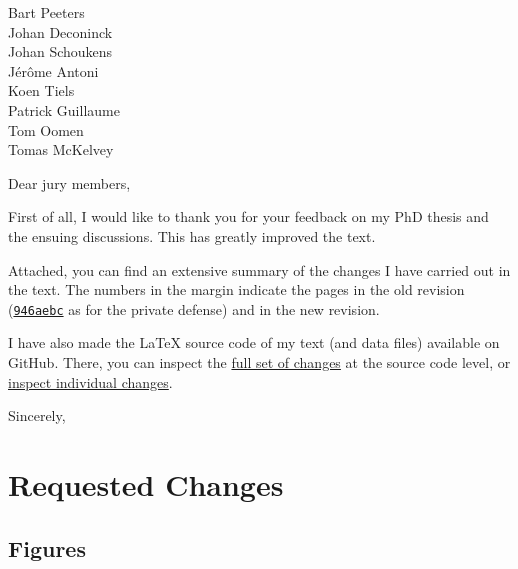 \documentclass{responseletter}
\date{\today}
\begin{document}
\begin{letter}{%
Bart Peeters \\
Johan Deconinck \\
Johan Schoukens \\
Jérôme Antoni \\
Koen Tiels \\
Patrick Guillaume \\
Tom Oomen \\
Tomas McKelvey 
}

\opening{Dear jury members,}

First of all, I would like to thank you for your feedback on my PhD thesis and the ensuing discussions.
This has greatly improved the text.

Attached, you can find an extensive summary of the changes I have carried out in the text.
The numbers in the margin indicate the pages in the old revision (\href{https://github.com/egeerardyn/phdthesis/releases/tag/private-submit}{\texttt{946aebc}} as for the private defense) and in the new revision.

I have also made the \LaTeX{} source code of my text (and data files) available on GitHub.
There, you can inspect the \href{https://github.com/egeerardyn/phdthesis/compare/b6b273e...master}{full set of changes} at the source code level, or \href{https://github.com/egeerardyn/phdthesis/commits/master}{inspect individual changes}.

\closing{Sincerely,}
\end{letter}


\section{Requested Changes}

\subsection{Figures}
\end{document}
